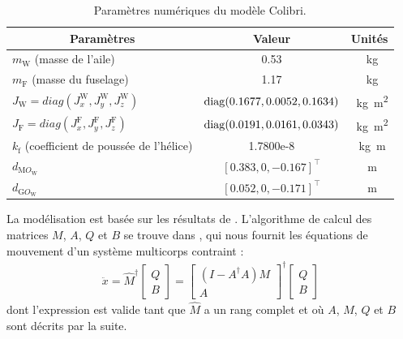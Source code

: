 \begin{table}[ht]
  \centering
    \begin{tabular}{|l|c|c|}
      \hline
      \multicolumn{1}{|c|}{Paramètres} & Valeur & Unités  \\
      \hline
      $m_{\text{W}}$ (masse de l'aile)  & 0.53& \SI{}{\kilogram} \\
      \hline
      $m_{\text{F}}$ (masse du fuselage)  & 1.17& \SI{}{\kilogram} \\
      \hline
      $J_{\text{W}}=diag(J_{x}^{\text{W}}, J_{y}^{\text{W}}, J_{z}^{\text{W}})$ & \!\! $\operatorname{diag}(0.1677,0.0052,0.1634)$\!\! & \SI{}{\kilogram\square\meter}\\
      \hline
      $J_{\text{F}}=diag(J_{x}^{\text{F}}, J_{y}^{\text{F}}, J_{z}^{\text{F}})$ & \!\! $\operatorname{diag}(0.0191,0.0161,0.0343)$\!\! & \SI{}{\kilogram\square\meter}\\
      \hline
      $k_{\text{f}}$ (coefficient de poussée de l'hélice) & 1.7800e-8 & \SI{}{\kilogram\meter}\\
      \hline
       $d_{\text{M}O_{\text{W}}}$  & $[0.383,0,-0.167]^\top$ & \SI{}{\meter}\\
      \hline
       $d_{\text{G}O_{\text{W}}}$  & $[0.052,0,-0.171]^\top$ & \SI{}{\meter}\\
      \hline
    \end{tabular}
    \caption{Paramètres numériques du modèle Colibri.}
    \label{tab:pars_colibri}
\end{table}

La modélisation est basée sur les résultats de \cite[Section 2.15]{udwadia-phohomsiri}. L'algorithme de calcul des matrices $M$, $A$, $Q$ et $B$ se trouve dans \cite{udwadia-schutte}, qui nous fournit les équations de mouvement d'un système multicorps contraint : 
\begin{align}
\label{eq:udwadia}
    \ddot{x} = \hat{M}^{\dag} \begin{bmatrix} Q \\ B \end{bmatrix}  = \begin{bmatrix} (I - A^{\dag}A)M \\ A \end{bmatrix}^{\dag} \begin{bmatrix} Q \\ B \end{bmatrix}
\end{align}
dont l'expression est valide tant que $\hat{M}$ a un rang complet et où $A$, $M$, $Q$ et $B$ sont décrits par la suite.

